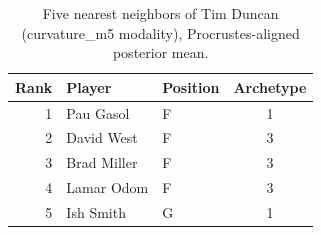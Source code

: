 \begin{table}[htbp]
  \centering\small
  \begin{tabular}{rllc}
    \toprule
    Rank & Player & Position & Archetype \\
    \midrule
    1 & Pau Gasol & F & 1 \\
    2 & David West & F & 3 \\
    3 & Brad Miller & F & 3 \\
    4 & Lamar Odom & F & 3 \\
    5 & Ish Smith & G & 1 \\
    \bottomrule
  \end{tabular}
  \caption{Five nearest neighbors of Tim Duncan (curvature_m5 modality), Procrustes-aligned posterior mean.}
  \label{tab:Tim_Duncan_neighbors_curvature_m5}
\end{table}

